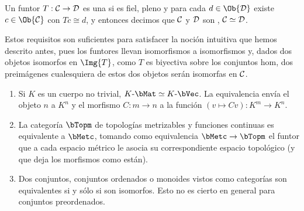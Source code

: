 \begin{definition}
  Un funtor $T:\mathcal{C}\to\mathcal{D}$ es una  si es fiel, pleno y para
  cada $d\in\Ob{\cD}$ existe $c\in\Ob{\cC}$ con $Tc\cong d$, y entonces decimos
  que $\mathcal{C}$ y $\mathcal{D}$ son , $\mathcal{C}\simeq\mathcal{D}$.
\end{definition}

Estos requisitos son suficientes para satisfacer la noción intuitiva que hemos
descrito antes, pues los funtores llevan isomorfismos a isomorfismos y, dados
dos objetos isomorfos en $\Img{T}$, como $T$ es biyectiva sobre los conjuntos
hom, dos preimágenes cualesquiera de estos dos objetos serán isomorfas en $\mathcal{C}$.

\begin{example}\;
  \begin{enumerate}
  \item Si $K$ es un cuerpo no trivial, $K\dash\bMat\simeq K\dash\bVec$. La
    equivalencia envía el objeto $n$ a $K^n$ y el morfismo $C:m\to n$ a la
    función $(v\mapsto Cv):K^m\to K^n$.
  \item La categoría $\bTopm$ de topologías metrizables y funciones continuas es
    equivalente a $\bMetc$, tomando como equivalencia $\bMetc\to\bTopm$ el
    funtor que a cada espacio métrico le asocia su correspondiente espacio
    topológico (y que deja los morfismos como están).
  \item Dos conjuntos, conjuntos ordenados o monoides vistos como categorías son
    equivalentes si y sólo si son isomorfos. Esto no es cierto en general para
    conjuntos preordenados.
  \end{enumerate}
\end{example}

